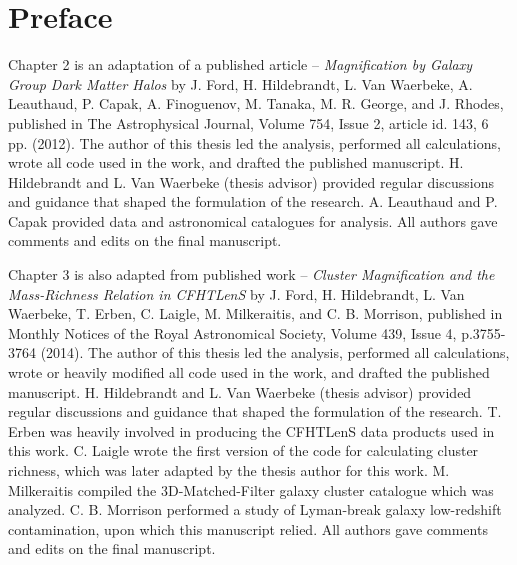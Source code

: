 
\chapter{Preface}
\label{preface}

Chapter 2 is an adaptation of a published article -- {\it Magnification by Galaxy Group Dark Matter Halos} by J. Ford, H. Hildebrandt, L. Van Waerbeke, A. Leauthaud, P. Capak, A. Finoguenov, M. Tanaka, M. R. George, and J. Rhodes, published in The Astrophysical Journal, Volume 754, Issue 2, article id. 143, 6 pp. (2012). The author of this thesis led the analysis, performed all calculations, wrote all code used in the work, and drafted the published manuscript. H. Hildebrandt and L. Van Waerbeke (thesis advisor) provided regular discussions and guidance that shaped the formulation of the research. A. Leauthaud and P. Capak provided data and astronomical catalogues for analysis. All authors gave comments and edits on the final manuscript.


Chapter 3 is also adapted from published work -- {\it Cluster Magnification and the Mass-Richness Relation in CFHTLenS} by J. Ford, H. Hildebrandt, L. Van Waerbeke, T. Erben, C. Laigle, M. Milkeraitis, and C. B. Morrison, published in Monthly Notices of the Royal Astronomical Society, Volume 439, Issue 4, p.3755-3764 (2014). The author of this thesis led the analysis, performed all calculations, wrote or heavily modified all code used in the work, and drafted the published manuscript. H. Hildebrandt and L. Van Waerbeke (thesis advisor) provided regular discussions and guidance that shaped the formulation of the research. T. Erben was heavily involved in producing the CFHTLenS data products used in this work. C. Laigle wrote the first version of the code for calculating cluster richness, which was later adapted by the thesis author for this work. M. Milkeraitis compiled the 3D-Matched-Filter galaxy cluster catalogue which was analyzed. C. B. Morrison performed a study of Lyman-break galaxy low-redshift contamination, upon which this manuscript relied. All authors gave comments and edits on the final manuscript.


